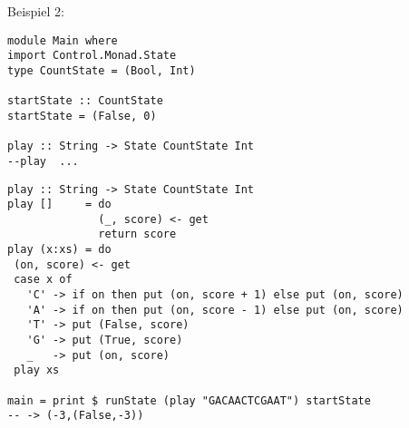 \documentclass{beamer}
\begin{document}
\begin{frame}[fragile]
Beispiel 2:
\begin{verbatim}
module Main where
import Control.Monad.State
type CountState = (Bool, Int)
 
startState :: CountState
startState = (False, 0)

play :: String -> State CountState Int
--play  ...

\end{verbatim}
\end{frame}

\begin{frame}[fragile]
\begin{verbatim}
play :: String -> State CountState Int
play []     = do
              (_, score) <- get
              return score
play (x:xs) = do
 (on, score) <- get
 case x of
   'C' -> if on then put (on, score + 1) else put (on, score)
   'A' -> if on then put (on, score - 1) else put (on, score)
   'T' -> put (False, score)
   'G' -> put (True, score)
   _   -> put (on, score)
 play xs

main = print $ runState (play "GACAACTCGAAT") startState
-- -> (-3,(False,-3))
\end{verbatim}
\end{frame}
\end{document}
